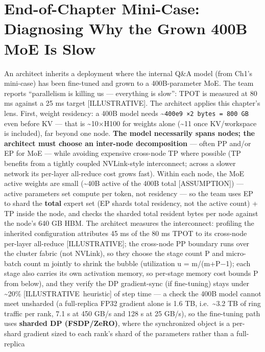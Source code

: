 \section{End-of-Chapter Mini-Case: Diagnosing Why the Grown 400B MoE Is
Slow}\label{end-of-chapter-mini-case-diagnosing-why-the-grown-400b-moe-is-slow}

An architect inherits a deployment where the internal Q\&A model (from
Ch1's mini-case) has been fine-tuned and grown to a 400B-parameter MoE.
The team reports ``parallelism is killing us --- everything is slow'':
TPOT is measured at 80 ms against a 25 ms target \mbox{{[}ILLUSTRATIVE{]}}. The
architect applies this chapter's lens. First, weight residency: a 400B
model needs \textasciitilde{}\texttt{400e9\ ×2\ bytes\ =\ 800\ GB} even
before KV --- that is \textasciitilde10×H100 for weights alone
(\textasciitilde11 once KV/workspace is included), far beyond one node.
\textbf{The model necessarily spans nodes; the architect must choose an
inter-node decomposition} --- often PP and/or EP for MoE --- while
avoiding expensive cross-node TP where possible (TP benefits from a
tightly coupled NVLink-style interconnect; across a slower network its
per-layer all-reduce cost grows fast). Within each node, the MoE active
weights are small (\textasciitilde40B active of the 400B total
\mbox{{[}ASSUMPTION{]}}) --- active parameters set compute per token, not
residency --- so the team uses EP to shard the \textbf{total} expert set
(EP shards total residency, not the active count) + TP inside the node,
and checks the sharded total resident bytes per node against the node's
640 GB HBM. The architect measures the interconnect: profiling the
inherited configuration attributes 45 ms of the 80 ms TPOT to its
cross-node per-layer all-reduce \mbox{{[}ILLUSTRATIVE{]}}; the cross-node PP
boundary runs over the cluster fabric (not NVLink), so they choose the
stage count P and micro-batch count m jointly to shrink the bubble
(utilization u = m/(m+P−1); each stage also carries its own activation
memory, so per-stage memory cost bounds P from below), and they verify
the DP gradient-sync (if fine-tuning) stays under \textasciitilde20\%
\mbox{{[}ILLUSTRATIVE heuristic{]}} of step time --- a check the 400B model
cannot meet unsharded (a full-replica FP32 gradient alone is 1.6 TB,
i.e.~\textasciitilde3.2 TB of ring traffic per rank, 7.1 s at 450 GB/s
and 128 s at 25 GB/s), so the fine-tuning path uses \textbf{sharded DP
(FSDP/ZeRO)}, where the synchronized object is a per-shard gradient
sized to each rank's shard of the parameters rather than a full-replica

